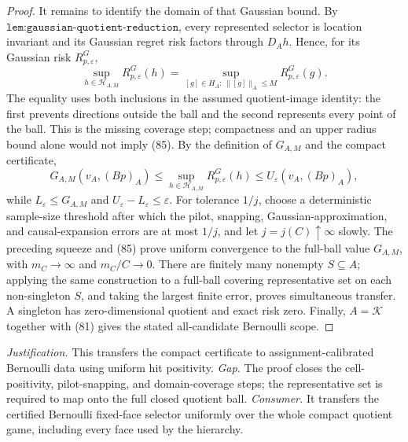 \documentclass{article}
\begin{document}
\begin{proof}
It remains to identify the domain of that Gaussian bound.  By \(\texttt{lem:gaussian-quotient-reduction}\), every represented selector is location invariant and its Gaussian regret risk factors through \(D_Ah\).  Hence, for its Gaussian risk \(R_{p,\varepsilon}^G\),
\[
\sup_{h\in\mathscr H_{A,M}}R_{p,\varepsilon}^G(h)
=\sup_{[g]\in H_A:\,\lVert[g]\rVert_A\leq M}
  R_{p,\varepsilon}^G(g).                                       \tag{85}
\]
The equality uses both inclusions in the assumed quotient-image identity: the first prevents directions outside the ball and the second represents every point of the ball.  This is the missing coverage step; compactness and an upper radius bound alone would not imply (85).  By the definition of \(G_{A,M}\) and the compact certificate,
\[
G_{A,M}(v_A,(Bp)_A)
\leq\sup_{h\in\mathscr H_{A,M}}R_{p,\varepsilon}^G(h)
\leq U_\varepsilon(v_A,(Bp)_A),
\]
while \(L_\varepsilon\leq G_{A,M}\) and \(U_\varepsilon-L_\varepsilon\leq\varepsilon\).  For tolerance \(1/j\), choose a deterministic sample-size threshold after which the pilot, snapping, Gaussian-approximation, and causal-expansion errors are at most \(1/j\), and let \(j=j(C)\uparrow\infty\) slowly.  The preceding squeeze and (85) prove uniform convergence to the full-ball value \(G_{A,M}\), with \(m_C\to\infty\) and \(m_C/C\to0\).  There are finitely many nonempty \(S\subseteq A\); applying the same construction to a full-ball covering representative set on each non-singleton \(S\), and taking the largest finite error, proves simultaneous transfer.  A singleton has zero-dimensional quotient and exact risk zero.  Finally, \(A=\mathcal K\) together with (81) gives the stated all-candidate Bernoulli scope.
\end{proof}
\par\smallskip\noindent \textit{Justification.} This transfers the compact certificate to assignment-calibrated Bernoulli data using uniform hit positivity. \textit{Gap.} The proof closes the cell-positivity, pilot-snapping, and domain-coverage steps; the representative set is required to map onto the full closed quotient ball. \textit{Consumer.} It transfers the certified Bernoulli fixed-face selector uniformly over the whole compact quotient game, including every face used by the hierarchy.
\end{document}
